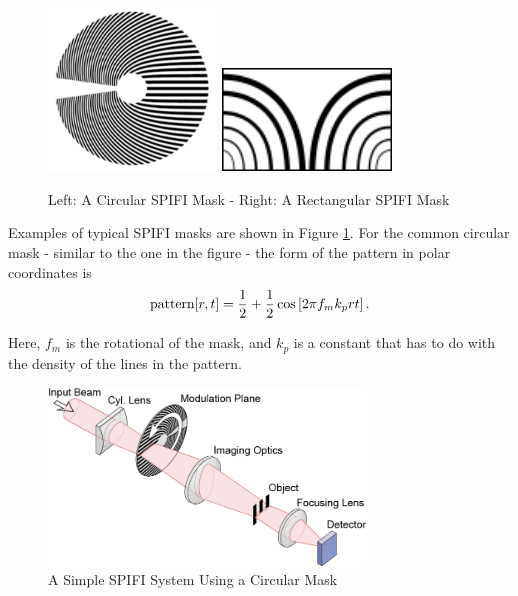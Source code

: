 \documentclass[12pt]{article}
\begin{document}
\begin{figure}[H]
\includegraphics[width=0.4\textwidth]{spinner}
\hfill
\includegraphics[width=0.4\textwidth]{rectangular_spifi_mask}
\caption{Left: A Circular SPIFI Mask -
Right: A Rectangular SPIFI Mask\label{fig:ex-grat}}
\end{figure}

Examples of typical SPIFI masks are
shown in Figure \ref{fig:ex-grat}. For the common circular mask - 
similar to the one in the figure - the form of the pattern in polar
coordinates is
\begin{equation}
\textnormal{pattern}[r,t]=\frac{1}{2}+\frac{1}{2}\cos\left[2\pi
f_mk_prt\right].
\label{eq:pattern}
\end{equation}

Here, $f_m$ is the rotational of the mask, and $k_p$ is a constant
that has to do with the density of the lines in the pattern.

\begin{figure}[H]
\centering
\includegraphics[width=0.75\textwidth]{circular_SPIFI_system}
\caption{A Simple SPIFI System Using a Circular Mask}
\label{fig:circ-sys}
\end{figure}
\end{document}
